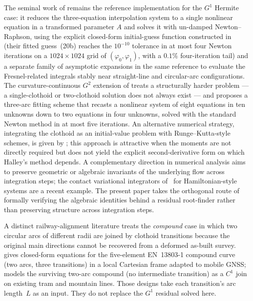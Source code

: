 \documentclass[11pt,a4paper]{article}
\begin{document}
The seminal work of \citet{Bertolazzi2015} remains the reference implementation for the $G^1$ Hermite case: it reduces the three-equation interpolation system to a single nonlinear equation in a transformed parameter $A$ and solves it with un-damped Newton--Raphson, using the explicit closed-form initial-guess function constructed in \citep{Bertolazzi2013arxiv} (their fitted guess~(20b) reaches the $10^{-10}$ tolerance in at most four Newton iterations on a $1024\times 1024$ grid of $(\varphi_0,\varphi_1)$, with a $0.1\%$ four-iteration tail) and a separate family of asymptotic expansions in the same reference to evaluate the Fresnel-related integrals stably near straight-line and circular-arc configurations. The curvature-continuous $G^2$ extension of \citet{Bertolazzi2018} treats a structurally harder problem --- a single-clothoid or two-clothoid solution does not always exist --- and proposes a three-arc fitting scheme that recasts a nonlinear system of eight equations in ten unknowns down to two equations in four unknowns, solved with the standard Newton method in at most five iterations. An alternative numerical strategy, integrating the clothoid as an initial-value problem with Runge--Kutta-style schemes, is given by \citet{VazquezMendez2015}; this approach is attractive when the moments are not directly required but does not yield the explicit second-derivative form on which Halley's method depends. A complementary direction in numerical analysis aims to preserve geometric or algebraic invariants of the underlying flow across integration steps; the contact variational integrators of~\citet{Seri2019contact} for Hamiltonian-style systems are a recent example. The present paper takes the orthogonal route of formally verifying the algebraic identities behind a residual root-finder rather than preserving structure across integration steps.

A distinct railway-alignment literature treats the \emph{compound} case in which two circular arcs of different radii are joined by clothoid transitions because the original main directions cannot be recovered from a deformed as-built survey. \citet{Koc2015} gives closed-form equations for the five-element EN~13803-1 compound curve (two arcs, three transitions) in a local Cartesian frame adapted to mobile GNSS; \citet{Koc2025} models the surviving two-arc compound (no intermediate transition) as a $C^1$ join on existing tram and mountain lines. Those designs take each transition's arc length~$L$ as an input. They do not replace the $G^1$ residual solved here.
\end{document}
